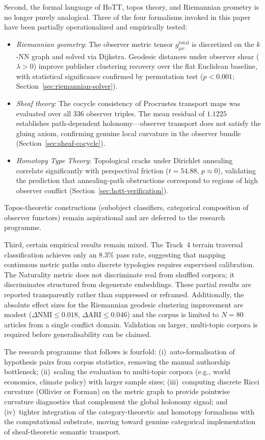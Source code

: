 Second, the formal language of HoTT, topos theory, and Riemannian geometry is no longer purely analogical. Three of the four formalisms invoked in this paper have been partially operationalized and empirically tested:
\begin{itemize}
    \item \emph{Riemannian geometry}: The observer metric tensor $g_{\mu\nu}^{\text{total}}$ is discretized on the $k$-NN graph and solved via Dijkstra. Geodesic distances under observer shear ($\lambda > 0$) improve publisher clustering recovery over the flat Euclidean baseline, with statistical significance confirmed by permutation test ($p < 0.001$; Section~\ref{sec:riemannian-solver}).
    \item \emph{Sheaf theory}: The cocycle consistency of Procrustes transport maps was evaluated over all 336 observer triples. The mean residual of $1.1225$ establishes path-dependent holonomy---observer transport does not satisfy the gluing axiom, confirming genuine local curvature in the observer bundle (Section~\ref{sec:sheaf-cocycle}).
    \item \emph{Homotopy Type Theory}: Topological cracks under Dirichlet annealing correlate significantly with perspectival friction ($t = 54.88$, $p \approx 0$), validating the prediction that annealing-path obstructions correspond to regions of high observer conflict (Section~\ref{sec:hott-verification}).
\end{itemize}
Topos-theoretic constructions (subobject classifiers, categorical composition of observer functors) remain aspirational and are deferred to the research programme.

Third, certain empirical results remain mixed. The Track~4 terrain traversal classification achieves only an $8.3\%$ pass rate, suggesting that mapping continuous metric paths onto discrete typologies requires supervised calibration. The Naturality metric does not discriminate real from shuffled corpora; it discriminates structured from degenerate embeddings. These partial results are reported transparently rather than suppressed or reframed. Additionally, the absolute effect sizes for the Riemannian geodesic clustering improvement are modest ($\Delta\text{NMI} \leq 0.018$, $\Delta\text{ARI} \leq 0.046$) and the corpus is limited to $N = 80$ articles from a single conflict domain. Validation on larger, multi-topic corpora is required before generalisability can be claimed.

The research programme that follows is fourfold: (i)~auto-formalisation of hypothesis pairs from corpus statistics, removing the manual authorship bottleneck; (ii)~scaling the evaluation to multi-topic corpora (e.g., world economics, climate policy) with larger sample sizes; (iii)~computing discrete Ricci curvature (Ollivier or Forman) on the metric graph to provide pointwise curvature diagnostics that complement the global holonomy signal; and (iv)~tighter integration of the category-theoretic and homotopy formalisms with the computational substrate, moving toward genuine categorical implementation of sheaf-theoretic semantic transport.

